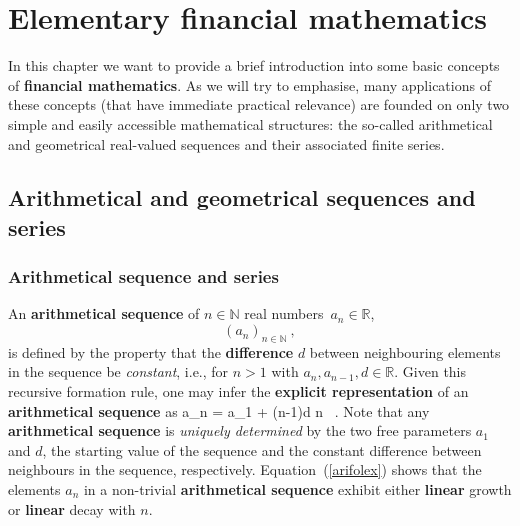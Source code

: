 \chapter[Elementary financial mathematics]%
{Elementary financial mathematics}

\vspace{10mm}
\noindent
In this chapter we want to provide a brief introduction into some 
basic concepts of {\bf financial mathematics}. As we will try to 
emphasise, many applications of these concepts (that have 
immediate practical relevance) are founded on only two simple and 
easily accessible mathematical structures: the so-called 
arithmetical and geometrical real-valued sequences and their 
associated finite series.

\section[Arithmetical and geometrical sequences and series]%
{Arithmetical and geometrical sequences and series}
\subsection{Arithmetical sequence and series}
An {\bf arithmetical sequence} of $n \in \mathbb{N}$ real 
numbers~$a_{n} \in \mathbb{R}$,
%
\[
(a_{n})_{n \in \mathbb{N}} \ ,
\]
%
is defined by the property that the {\bf difference} $d$ between 
neighbouring elements in the sequence be \emph{constant}, i.e., 
for  $n>1$
%
\be
{}
\ee
%
with $a_{n}, a_{n-1}, d \in \mathbb{R}$. Given this recursive 
formation rule, one may infer the {\bf explicit representation} of 
an {\bf arithmetical sequence} as
%
\be
{}
a_{n} = a_{1} + (n-1)d
\quad{}\quad
n \in {} \ .
\ee
%
Note that any {\bf arithmetical sequence} is \emph{uniquely 
determined} by the two free parameters $a_{1}$ and $d$, the 
starting value of the sequence and the constant difference between 
neighbours in the sequence, respectively. 
Equation~(\ref{arifolex}) shows that the elements $a_{n}$ in a 
non-trivial {\bf arithmetical sequence} exhibit either {\bf 
linear} growth or {\bf linear} decay with $n$.


